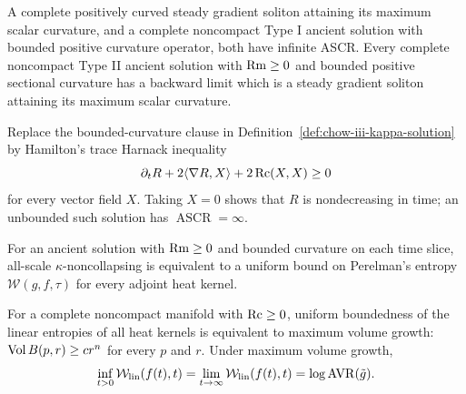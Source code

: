\begin{theorem}
\label{thm:chow-iii-infinite-ascr}
A complete positively curved steady gradient soliton attaining its maximum
scalar curvature, and a complete noncompact Type I ancient solution with
bounded positive curvature operator, both have infinite ASCR.  Every complete
noncompact Type II ancient solution with $\operatorname{Rm}\ge0$ and bounded positive
sectional curvature has a backward limit which is a steady gradient soliton
attaining its maximum scalar curvature.
\end{theorem}

\begin{definition}
\label{def:chow-iii-kappa-harnack}
Replace the bounded-curvature clause in Definition~\ref{def:chow-iii-kappa-solution}
by Hamilton's trace Harnack inequality
\[
\partial_tR+2\langle\nabla R,X\rangle+2\operatorname{Rc}(X,X)\ge0
\]
for every vector field $X$.  Taking $X=0$ shows that $R$ is nondecreasing in
time; an unbounded such solution has $\operatorname{ASCR}=\infty$.
\end{definition}

\begin{claim}
\label{clm:chow-iii-entropy-kappa}
For an ancient solution with $\operatorname{Rm}\ge0$ and bounded curvature on each time
slice, all-scale $\kappa$-noncollapsing is equivalent to a uniform bound on
Perelman's entropy $\mathcal W(g,f,\tau)$ for every adjoint heat kernel.
\end{claim}

\begin{theorem}
\label{thm:chow-iii-linear-entropy-volume}
For a complete noncompact manifold with $\operatorname{Rc}\ge0$, uniform boundedness of the
linear entropies of all heat kernels is equivalent to maximum volume growth:
$\operatorname{Vol} B(p,r)\ge cr^n$ for every $p$ and $r$.  Under maximum volume growth,
\[
\inf_{t>0}\mathcal W_{\rm lin}(f(t),t)=\lim_{t\to\infty}\mathcal W_{\rm lin}(f(t),t)
=\log\operatorname{AVR}(\tilde g).
\]
\end{theorem}

